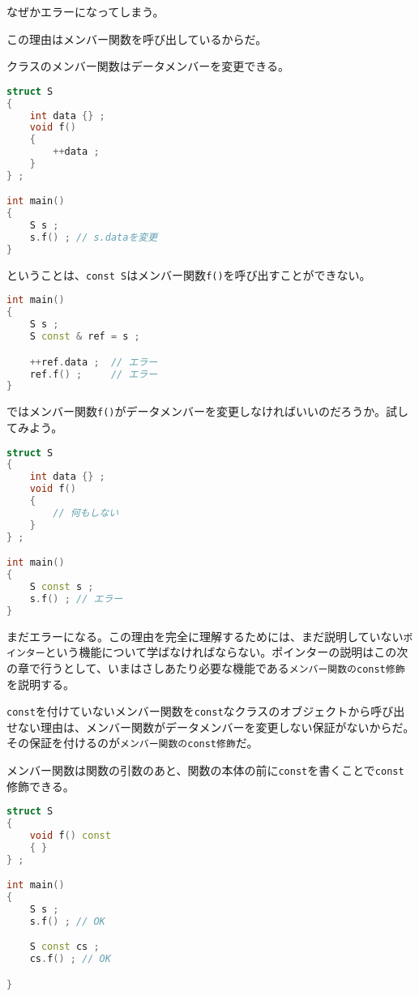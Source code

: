なぜかエラーになってしまう。

この理由はメンバー関数を呼び出しているからだ。

クラスのメンバー関数はデータメンバーを変更できる。

\begin{lstlisting}[language={C++}]
struct S
{
    int data {} ;
    void f()
    {
        ++data ;
    }
} ;

int main()
{
    S s ;
    s.f() ; // s.dataを変更
}
\end{lstlisting}

ということは、\texttt{const S}はメンバー関数\texttt{f()}を呼び出すことができない。

\begin{lstlisting}[language={C++}]
int main()
{
    S s ;
    S const & ref = s ;

    ++ref.data ;  // エラー
    ref.f() ;     // エラー
}
\end{lstlisting}

ではメンバー関数\texttt{f()}がデータメンバーを変更しなければいいのだろうか。試してみよう。

\begin{lstlisting}[language={C++}]
struct S
{
    int data {} ;
    void f()
    {
        // 何もしない
    }
} ;

int main()
{
    S const s ;
    s.f() ; // エラー
}
\end{lstlisting}

まだエラーになる。この理由を完全に理解するためには、まだ説明していない\texttt{ポインター}という機能について学ばなければならない。ポインターの説明はこの次の章で行うとして、いまはさしあたり必要な機能である\texttt{メンバー関数のconst修飾}を説明する。

\texttt{const}を付けていないメンバー関数を\texttt{const}なクラスのオブジェクトから呼び出せない理由は、メンバー関数がデータメンバーを変更しない保証がないからだ。その保証を付けるのが\texttt{メンバー関数のconst修飾}だ。

メンバー関数は関数の引数のあと、関数の本体の前に\texttt{const}を書くことで\texttt{const}修飾できる。

\begin{lstlisting}[language={C++}]
struct S
{
    void f() const
    { }
} ;

int main()
{
    S s ;
    s.f() ; // OK

    S const cs ;
    cs.f() ; // OK

}
\end{lstlisting}

